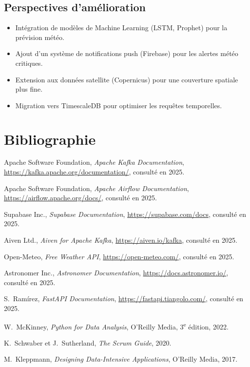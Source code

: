 \documentclass[a4paper,12pt,oneside]{report}
\begin{document}
\section*{Perspectives d'amélioration}
\begin{itemize}
  \item Intégration de modèles de Machine Learning (LSTM, Prophet) pour la prévision météo.
  \item Ajout d'un système de notifications push (Firebase) pour les alertes météo critiques.
  \item Extension aux données satellite (Copernicus) pour une couverture spatiale plus fine.
  \item Migration vers TimescaleDB pour optimiser les requêtes temporelles.
\end{itemize}

\chapter*{Bibliographie}

\begin{enumerate}[label={[\arabic*]}]
  \item Apache Software Foundation, \textit{Apache Kafka Documentation}, \url{https://kafka.apache.org/documentation/}, consulté en 2025.
  \item Apache Software Foundation, \textit{Apache Airflow Documentation}, \url{https://airflow.apache.org/docs/}, consulté en 2025.
  \item Supabase Inc., \textit{Supabase Documentation}, \url{https://supabase.com/docs}, consulté en 2025.
  \item Aiven Ltd., \textit{Aiven for Apache Kafka}, \url{https://aiven.io/kafka}, consulté en 2025.
  \item Open-Meteo, \textit{Free Weather API}, \url{https://open-meteo.com/}, consulté en 2025.
  \item Astronomer Inc., \textit{Astronomer Documentation}, \url{https://docs.astronomer.io/}, consulté en 2025.
  \item S.~Ramírez, \textit{FastAPI Documentation}, \url{https://fastapi.tiangolo.com/}, consulté en 2025.
  \item W.~McKinney, \textit{Python for Data Analysis}, O'Reilly Media, 3\textsuperscript{e} édition, 2022.
  \item K.~Schwaber et J.~Sutherland, \textit{The Scrum Guide}, 2020.
  \item M.~Kleppmann, \textit{Designing Data-Intensive Applications}, O'Reilly Media, 2017.
\end{enumerate}
\end{document}
